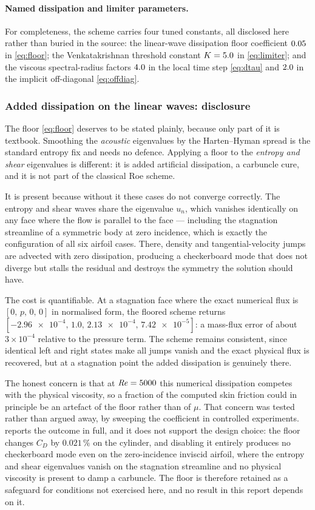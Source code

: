 \paragraph{Named dissipation and limiter parameters.} For completeness, the
scheme carries four tuned constants, all disclosed here rather than buried in the
source: the linear-wave dissipation floor coefficient $0.05$ in
\cref{eq:floor}; the Venkatakrishnan threshold constant $K=5.0$ in
\cref{eq:limiter}; and the viscous spectral-radius factors $4.0$ in
the local time step \cref{eq:dtau} and $2.0$ in the implicit
off-diagonal \cref{eq:offdiag}.

\subsubsection{Added dissipation on the linear waves: disclosure}
\label{sec:lineardissipation}

The floor \cref{eq:floor} deserves to be stated plainly, because only part of it
is textbook. Smoothing the \emph{acoustic} eigenvalues by the Harten--Hyman
spread is the standard entropy fix and needs no defence. Applying a floor to the
\emph{entropy and shear} eigenvalues is different: it is added artificial
dissipation, a carbuncle cure, and it is not part of the classical Roe scheme.

It is present because without it these cases do not converge correctly. The
entropy and shear waves share the eigenvalue $u_n$, which vanishes identically on
any face where the flow is parallel to the face --- including the stagnation
streamline of a symmetric body at zero incidence, which is exactly the
configuration of all six airfoil cases. There, density and tangential-velocity
jumps are advected with zero dissipation, producing a checkerboard mode that does
not diverge but stalls the residual and destroys the symmetry the solution should
have.

The cost is quantifiable. At a stagnation face where the exact numerical flux is
$[0,\,p,\,0,\,0]$ in normalised form, the floored scheme returns
$[\num{-2.96e-4},\,1.0,\,\num{2.13e-4},\,\num{7.42e-5}]$: a mass-flux error of
about $3\times10^{-4}$ relative to the pressure term. The scheme remains
consistent, since identical left and right states make all jumps vanish and the
exact physical flux is recovered, but at a stagnation point the added dissipation
is genuinely there.

The honest concern is that at $\mathit{Re}=5000$ this numerical dissipation competes
with the physical viscosity, so a fraction of the computed skin friction could in
principle be an artefact of the floor rather than of $\mu$. That concern was tested
rather than argued away, by sweeping the coefficient in controlled experiments.
 reports the outcome in full, and it does not support the
design choice: the floor changes $C_D$ by $0.021\,\%$ on the cylinder, and
disabling it entirely produces no checkerboard mode even on the zero-incidence
inviscid airfoil, where the entropy and shear eigenvalues vanish on the stagnation
streamline and no physical viscosity is present to damp a carbuncle. The floor is
therefore retained as a safeguard for conditions not exercised here, and no result
in this report depends on it.
